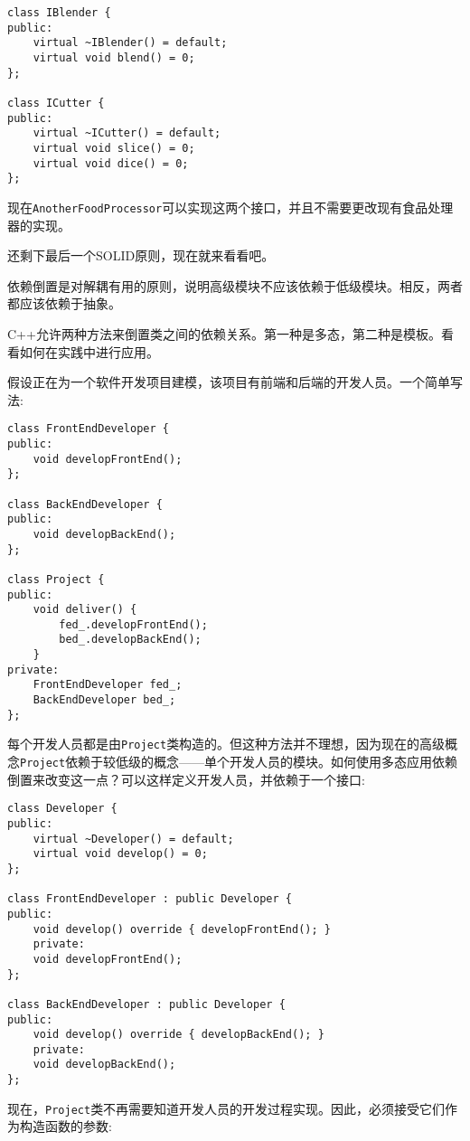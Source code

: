 \begin{lstlisting}[style=styleCXX]
class IBlender {
public:
	virtual ~IBlender() = default;
	virtual void blend() = 0;
};

class ICutter {
public:
	virtual ~ICutter() = default;
	virtual void slice() = 0;
	virtual void dice() = 0;
};
\end{lstlisting}

现在\texttt{AnotherFoodProcessor}可以实现这两个接口，并且不需要更改现有食品处理器的实现。

还剩下最后一个SOLID原则，现在就来看看吧。


依赖倒置是对解耦有用的原则，说明高级模块不应该依赖于低级模块。相反，两者都应该依赖于抽象。

C++允许两种方法来倒置类之间的依赖关系。第一种是多态，第二种是模板。看看如何在实践中进行应用。

假设正在为一个软件开发项目建模，该项目有前端和后端的开发人员。一个简单写法:

\begin{lstlisting}[style=styleCXX]
class FrontEndDeveloper {
public:
	void developFrontEnd();
};

class BackEndDeveloper {
public:
	void developBackEnd();
};

class Project {
public:
	void deliver() {
		fed_.developFrontEnd();
		bed_.developBackEnd();
	}
private:
	FrontEndDeveloper fed_;
	BackEndDeveloper bed_;
};
\end{lstlisting}

每个开发人员都是由\texttt{Project}类构造的。但这种方法并不理想，因为现在的高级概念\texttt{Project}依赖于较低级的概念——单个开发人员的模块。如何使用多态应用依赖倒置来改变这一点？可以这样定义开发人员，并依赖于一个接口:

\begin{lstlisting}[style=styleCXX]
class Developer {
public:
	virtual ~Developer() = default;
	virtual void develop() = 0;
};

class FrontEndDeveloper : public Developer {
public:
	void develop() override { developFrontEnd(); }
	private:
	void developFrontEnd();
};

class BackEndDeveloper : public Developer {
public:
	void develop() override { developBackEnd(); }
	private:
	void developBackEnd();
};
\end{lstlisting}

现在，\texttt{Project}类不再需要知道开发人员的开发过程实现。因此，必须接受它们作为构造函数的参数:

